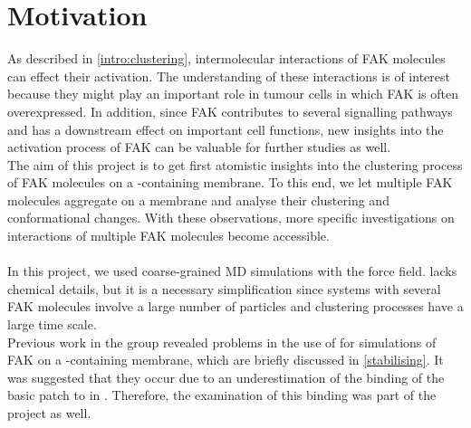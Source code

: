 \chapter{Motivation}
As described in \autoref{intro:clustering}, intermolecular interactions of FAK molecules can effect their activation. The understanding of these interactions is of interest because they might play an important role in tumour cells in which FAK is often overexpressed. In addition, since FAK contributes to several signalling pathways and has a downstream effect on important cell functions, new insights into the activation process of FAK can be valuable for further studies as well.\\
The aim of this project is to get first atomistic insights into the clustering process of FAK molecules on a \pip{}-containing membrane. To this end, we let multiple FAK molecules aggregate on a membrane and analyse their clustering and conformational changes. With these observations, more specific investigations on interactions of multiple FAK molecules become accessible.\\
\\
In this project, we used coarse-grained MD simulations with the \martini{} force field. \martini{} lacks chemical details, but it is a necessary simplification since systems with several FAK molecules involve a large number of particles and clustering processes have a large time scale.\\
Previous work in the group revealed problems in the use of \martini{} for simulations of FAK on a \pip{}-containing membrane, which are briefly discussed in \autoref{stabilising}. It was suggested that they occur due to an underestimation of the binding of the basic patch to \pip{} in \martini{}. Therefore, the examination of this binding was part of the project as well.

